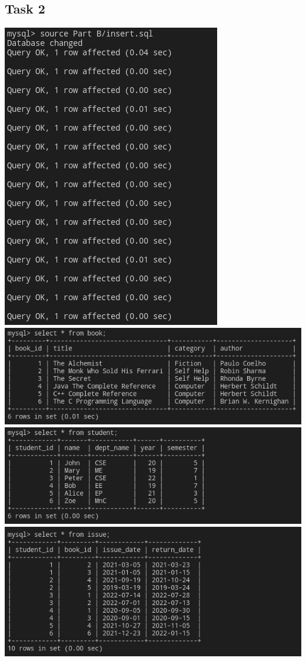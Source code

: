\documentclass{article}
\begin{document}
\subsection*{Task 2}
\includegraphics[scale=0.6]{screenshots/partb/insert.png}\\
\includegraphics[scale=0.6]{screenshots/partb/books.png}\\
\includegraphics[scale=0.6]{screenshots/partb/students.png}\\
\includegraphics[scale=0.6]{screenshots/partb/issues.png}
\end{document}
